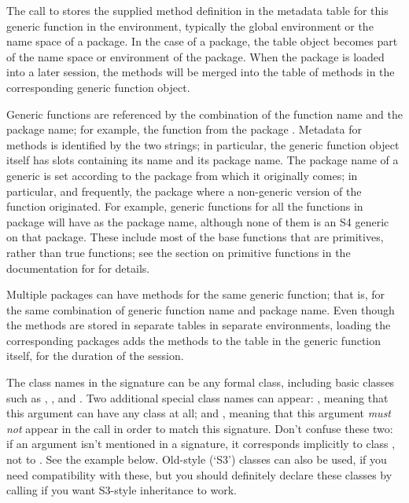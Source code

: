 \begin{Details}\relax
The call to  stores the supplied method definition  in
the metadata table for this generic function in the environment,
typically the global environment or the name space of a package.
In the case of a package, the table object becomes part of the name space or environment of the
package.
When the package is loaded into a later session, the
methods will be merged into the table of methods in the corresponding
generic function object.

Generic functions are referenced by the combination of the function name and
the package name;
for example, the function  from the package
.
Metadata for methods is identified by the two strings; in particular, the
generic function object itself has slots containing its name and its
package name.
The package name of a generic is set according to the package
from which it originally comes; in particular, and frequently, the
package where a non-generic version of the function originated.
For example, generic functions for all the functions in package  will
have  as the package name, although none of them is an
S4 generic on that package.
These include most of the base functions that are primitives, rather than
true functions; see the section on primitive functions in the
documentation for  for details.

Multiple packages can have methods for the same generic function; that
is, for the same combination of generic function name and package
name.
Even though the methods are stored in separate tables in separate
environments, loading the corresponding packages adds the methods to
the table in the generic function itself, for the duration of the session.

The class
names in the signature can be any formal class, including basic
classes such as , , and
.  Two additional special class names can appear:
, meaning that this argument can have any class at all;
and , meaning that this argument \emph{must not}
appear in the call in order to match this signature.  Don't confuse
these two:  if an argument isn't mentioned in a signature, it
corresponds implicitly to class , not to
.  See the example below.  Old-style (`S3')
classes can also be used, if you need compatibility with these, but
you should definitely declare these classes by calling
 if you want S3-style inheritance to work.



\end{Details}
